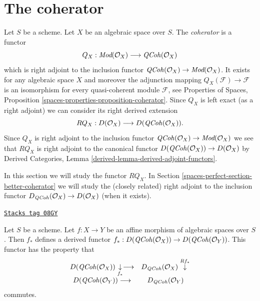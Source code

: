 \section{The coherator}
\label{spaces-perfect-section-coherator}
Let $S$ be a scheme. Let $X$ be an algebraic space over $S$.
The {\it coherator} is a functor
$$
Q_X :
\textit{Mod}(\mathcal{O}_X)
\longrightarrow
\mathit{QCoh}(\mathcal{O}_X)
$$
which is right adjoint to the inclusion functor
$\mathit{QCoh}(\mathcal{O}_X) \to \textit{Mod}(\mathcal{O}_X)$.
It exists for any algebraic space $X$ and moreover the adjunction mapping
$Q_X(\mathcal{F}) \to \mathcal{F}$ is an isomorphism for every
quasi-coherent module $\mathcal{F}$, see
Properties of Spaces, Proposition
\ref{spaces-properties-proposition-coherator}.
Since $Q_X$ is left exact (as a right adjoint) we can consider its
right derived extension
$$
RQ_X :
D(\mathcal{O}_X)
\longrightarrow
D(\mathit{QCoh}(\mathcal{O}_X)).
$$
Since $Q_X$ is right adjoint to the inclusion functor
$\mathit{QCoh}(\mathcal{O}_X) \to \textit{Mod}(\mathcal{O}_X)$
we see that $RQ_X$ is right adjoint to the canonical functor
$D(\mathit{QCoh}(\mathcal{O}_X)) \to D(\mathcal{O}_X)$ by
Derived Categories, Lemma \ref{derived-lemma-derived-adjoint-functors}.

\medskip\noindent
In this section we will study the functor $RQ_X$. In
Section \ref{spaces-perfect-section-better-coherator}
we will study the (closely related) right adjoint to the inclusion functor
$D_{\mathit{QCoh}}(\mathcal{O}_X) \to D(\mathcal{O}_X)$ (when it exists).

\begin{lemma}
\label{spaces-perfect-lemma-affine-pushforward}
\href{https://stacks.math.columbia.edu/tag/08GY}{\texttt{Stacks tag 08GY}}

Let $S$ be a scheme. Let $f : X \to Y$ be an affine morphism of
algebraic spaces over $S$. Then $f_*$ defines a derived functor
$f_* : D(\mathit{QCoh}(\mathcal{O}_X)) \to D(\mathit{QCoh}(\mathcal{O}_Y))$.
This functor has the property that
$$
\begin{array}{cc}D(\mathit{QCoh}(\mathcal{O}_X)) \underset{f_*}{\downarrow}\longrightarrow & D_{\mathit{QCoh}}(\mathcal{O}_X) \overset{Rf_*}{\downarrow} \\ D(\mathit{QCoh}(\mathcal{O}_Y)) \longrightarrow & D_{\mathit{QCoh}}(\mathcal{O}_Y)\end{array}
$$
commutes.
\end{lemma}

